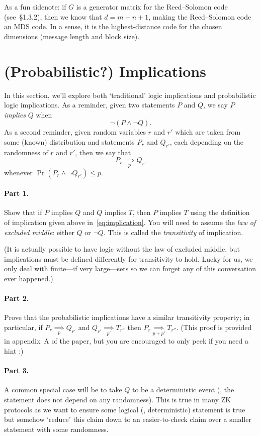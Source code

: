 \documentclass[12pt]{article}
\newcommand{\impliesn}[1]{\underset{#1}{\implies}}
\newcommand{\impliesp}{\impliesn{p}}
\newcommand{\impliespp}{\impliesn{p'}}
\begin{document}
As a fun sidenote: if $G$ is a generator matrix for the Reed--Solomon code
(see~\S1.3.2), then we know that $d = m - n + 1$, making the Reed--Solomon code
an MDS code. In a sense, it is the highest-distance code for the chosen
dimensions (message length and block size).

\section{(Probabilistic?) Implications}
In this section, we'll explore both `traditional' logic implications
and probabilistic logic implications. As a reminder, given two statements
$P$ and $Q$, we say $P$ \emph{implies} $Q$ when
\begin{equation}\label{eq:implication}
    \neg(P \wedge \neg Q).
\end{equation}
As a second reminder, given random variables $r$ and $r'$ which are taken
from some (known) distribution and statements $P_r$ and $Q_{r'}$, each
depending on the randomness of $r$ and $r'$, then we say that
\[
    P_r \impliesp Q_{r'}
\]
whenever $\Pr(P_r \wedge \neg Q_{r'}) \le p$.


\paragraph{Part 1.} Show that if $P$ implies $Q$ and $Q$ implies $T$, then $P$
implies $T$ using the definition of implication given
above in~\eqref{eq:implication}. You will need to assume the \emph{law of
excluded middle}: either $Q$ or $\neg Q$. This is called the \emph{transitivity}
of implication.

(It is actually possible to have logic without the law of excluded middle, but
implications must be defined differently for transitivity to hold. Lucky for
us, we only deal with finite---if very large---sets so we can forget any of
this conversation ever happened.)

\paragraph{Part 2.} Prove that the probabilistic implications have a similar
transitivity property; in particular, if $P_r \impliesp Q_{r'}$ and $Q_{r'}
\impliespp T_{r''}$ then $P_r \impliesn{p + p'} T_{r''}$. (This proof is
provided in appendix~A of the paper, but you are encouraged to only peek if you
need a hint :)

\paragraph{Part 3.} A common special case will be to take $Q$ to be a
deterministic event (\ie, the statement does not depend on any randomness).
This is true in many ZK protocols as we want to ensure some logical (\ie,
deterministic) statement is true but somehow `reduce' this claim down to an
easier-to-check claim over a smaller statement with some randomness.
\end{document}

